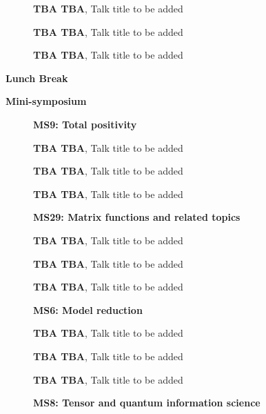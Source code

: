\documentclass[ILAS2025-program.tex]{subfiles}
\begin{document}
\begin{description}
\begin{description}
    \item[] \textbf{TBA TBA}, Talk title to be added
        \item[] \textbf{TBA TBA}, Talk title to be added
        \item[] \textbf{TBA TBA}, Talk title to be added
        \end{description}
    \item[\info{12:30\textrm{--}14:00}] \textbf{Lunch Break} \info{}
    \item[\info{14:00\textrm{--}15:30}] \textbf{Mini-symposium} 
    \begin{description}
    \item[] \textbf{MS9: Total positivity} 
    \item[] \textbf{TBA TBA}, Talk title to be added
        \item[] \textbf{TBA TBA}, Talk title to be added
        \item[] \textbf{TBA TBA}, Talk title to be added
        \end{description}
    \begin{description}
    \item[] \textbf{MS29: Matrix functions and related topics} 
    \item[] \textbf{TBA TBA}, Talk title to be added
        \item[] \textbf{TBA TBA}, Talk title to be added
        \item[] \textbf{TBA TBA}, Talk title to be added
        \end{description}
    \begin{description}
    \item[] \textbf{MS6: Model reduction} 
    \item[] \textbf{TBA TBA}, Talk title to be added
        \item[] \textbf{TBA TBA}, Talk title to be added
        \item[] \textbf{TBA TBA}, Talk title to be added
        \end{description}
    \begin{description}
    \item[] \textbf{MS8: Tensor and quantum information science} 

\end{description}
\end{description}
\end{document}
